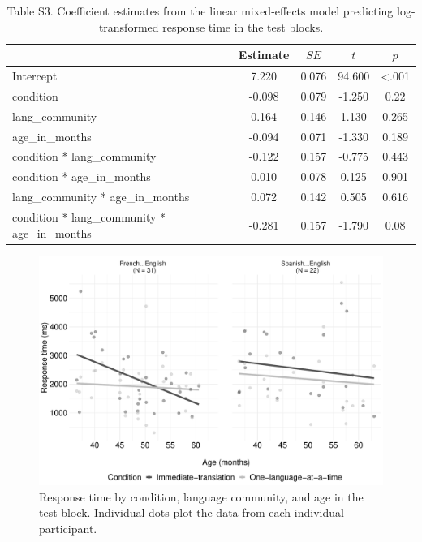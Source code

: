 \documentclass[
  man,floatsintext]{apa7}
\begin{document}
\begin{table}[tbp]

\begin{center}
\begin{threeparttable}

\caption{\label{tab:unnamed-chunk-9}Table S3. Coefficient estimates from the linear mixed-effects model predicting log-transformed response time in the test blocks.}

\begin{tabular}{lcccc}
\toprule
 & Estimate & $SE$ & $t$ & $p$\\
\midrule
Intercept & 7.220 & 0.076 & 94.600 & <.001\\
condition & -0.098 & 0.079 & -1.250 & 0.22\\
lang\_community & 0.164 & 0.146 & 1.130 & 0.265\\
age\_in\_months & -0.094 & 0.071 & -1.330 & 0.189\\
condition * lang\_community & -0.122 & 0.157 & -0.775 & 0.443\\
condition * age\_in\_months & 0.010 & 0.078 & 0.125 & 0.901\\
lang\_community * age\_in\_months & 0.072 & 0.142 & 0.505 & 0.616\\
condition * lang\_community * age\_in\_months & -0.281 & 0.157 & -1.790 & 0.08\\
\bottomrule
\end{tabular}

\end{threeparttable}
\end{center}

\end{table}

\begin{figure}

{\centering \includegraphics[width=0.9\linewidth]{TabletSwitch_supplemental_files/figure-latex/FigureS1-1} 

}

\caption{Response time by condition, language community, and age in the test block. Individual dots plot the data from each individual participant.}\label{fig:FigureS1}
\end{figure}
\end{document}
